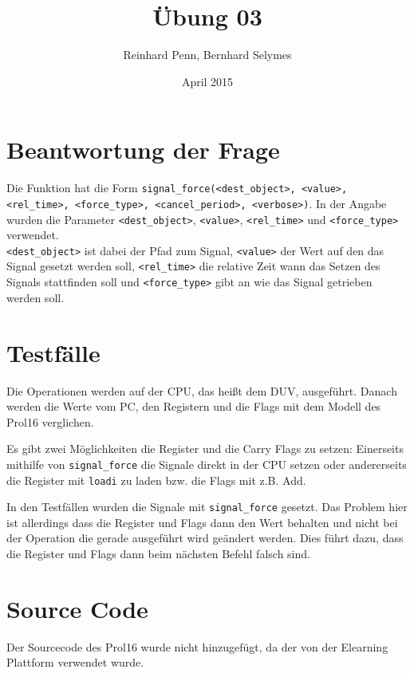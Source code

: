 \documentclass[12pt,a4paper]{article}
\begin{document}
\title{Übung 03}
\author{Reinhard Penn, Bernhard Selymes}
\date{April 2015}

\normalsize


\newcommand{\Uebung}{BFMSV}
\newcommand{\srcpath}{../../src}
\newcommand{\simpath}{../../sim}



\section{Beantwortung der Frage}
Die Funktion hat die Form \texttt{\textdollar signal\_force(<dest\_object>, <value>, <rel\_time>, <force\_type>, <cancel\_period>, <verbose>)}. In der Angabe wurden die Parameter \texttt{<dest\_object>}, \texttt{<value>}, \texttt{<rel\_time>} und \texttt{<force\_type>} verwendet. \\
\texttt{<dest\_object>} ist dabei der Pfad zum Signal, \texttt{<value>} der Wert auf den das Signal gesetzt werden soll, \texttt{<rel\_time>} die relative Zeit wann das Setzen des Signals stattfinden soll und \texttt{<force\_type>} gibt an wie das Signal getrieben werden soll.

\section{Testfälle}
Die Operationen werden auf der CPU, das heißt dem DUV, ausgeführt. Danach werden die Werte vom PC, den Registern und die Flags mit dem Modell des Prol16 verglichen.

Es gibt zwei Möglichkeiten die Register und die Carry Flags zu setzen: Einerseits mithilfe von \texttt{signal\_force} die Signale direkt in der CPU setzen oder andererseits die Register mit \texttt{loadi} zu laden bzw. die Flags mit z.B. Add. 

In den Testfällen wurden die Signale mit \texttt{signal\_force} gesetzt. Das Problem hier ist allerdings dass die Register und Flags dann den Wert behalten und nicht bei der Operation die gerade ausgeführt wird geändert werden. Dies führt dazu, dass die Register und Flags dann beim nächsten Befehl falsch sind.

\section{Source Code}

Der Sourcecode des Prol16 wurde nicht hinzugefügt, da der von der Elearning Plattform verwendet wurde.












\end{document}
